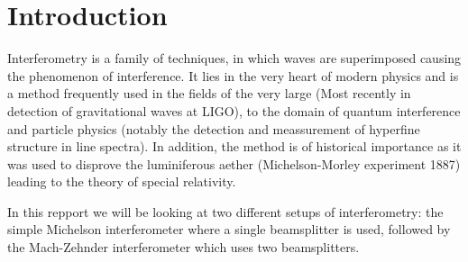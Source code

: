 \section{Introduction}
Interferometry is a family of techniques, in which waves are superimposed causing the phenomenon of interference. It lies in the very heart of modern physics and is a method frequently used in the fields of the very large (Most recently in detection of gravitational waves at LIGO), to the domain of quantum interference and particle physics (notably the detection and meassurement of hyperfine structure in line spectra). In addition, the method is of historical importance as it was used to disprove the luminiferous aether (Michelson-Morley experiment 1887) leading to the theory of special relativity. 

\noindent
In this repport we will be looking at two different setups of interferometry: the simple Michelson interferometer where a single beamsplitter is used, followed by the Mach-Zehnder interferometer which uses two beamsplitters.

